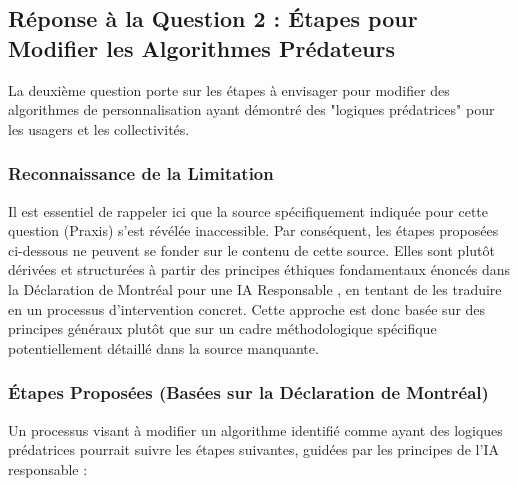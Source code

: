 \documentclass[10pt, twocolumn]{article}
\begin{document}
\subsection{Réponse à la Question 2 : Étapes pour Modifier les Algorithmes Prédateurs}

La deuxième question porte sur les étapes à envisager pour modifier des algorithmes de personnalisation ayant démontré des "logiques prédatrices" pour les usagers et les collectivités.

\subsubsection{Reconnaissance de la Limitation}
Il est essentiel de rappeler ici que la source spécifiquement indiquée pour cette question (Praxis) s'est révélée inaccessible. Par conséquent, les étapes proposées ci-dessous ne peuvent se fonder sur le contenu de cette source. Elles sont plutôt dérivées et structurées à partir des principes éthiques fondamentaux énoncés dans la Déclaration de Montréal pour une IA Responsable \citep{Montreal2018}, en tentant de les traduire en un processus d'intervention concret. Cette approche est donc basée sur des principes généraux plutôt que sur un cadre méthodologique spécifique potentiellement détaillé dans la source manquante.

\subsubsection{Étapes Proposées (Basées sur la Déclaration de Montréal)}

Un processus visant à modifier un algorithme identifié comme ayant des logiques prédatrices pourrait suivre les étapes suivantes, guidées par les principes de l'IA responsable \citep{Montreal2018} :
\end{document}
